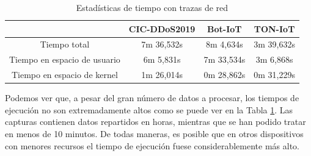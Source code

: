 \begin{table}[H]
    \begin{center}
        \begin{tabular}{|c | c c c |} 
            \hline
            & \textbf{CIC-DDoS2019} & \textbf{Bot-IoT} & \textbf{TON-IoT} \\
            \hline
            Tiempo total                 & 7m 36,532s & 8m  4,634s & 3m 39,632s \\
            Tiempo en espacio de usuario & 6m  5,831s & 7m 33,534s & 3m  6,868s \\
            Tiempo en espacio de kernel  & 1m 26,014s & 0m 28,862s & 0m 31,229s \\
            \hline
        \end{tabular}
    \end{center}
    \caption{Estadísticas de tiempo con trazas de red}
    \label{table:statstimeoffline}
\end{table}

Podemos ver que, a pesar del gran número de datos a procesar, los tiempos de ejecución no son extremadamente altos como se puede ver en la Tabla \ref{table:statstimeoffline}. Las capturas contienen datos repartidos en horas, mientras que se han podido tratar en menos de 10 minutos. De todas maneras, es posible que en otros dispositivos con menores recursos el tiempo de ejecución fuese considerablemente más alto.

\begin{table}[H]
    \begin{center}
    \end{center}
    \caption{Archivos generados con trazas de red}
    \label{table:generatedfilesoffline}
\end{table}

